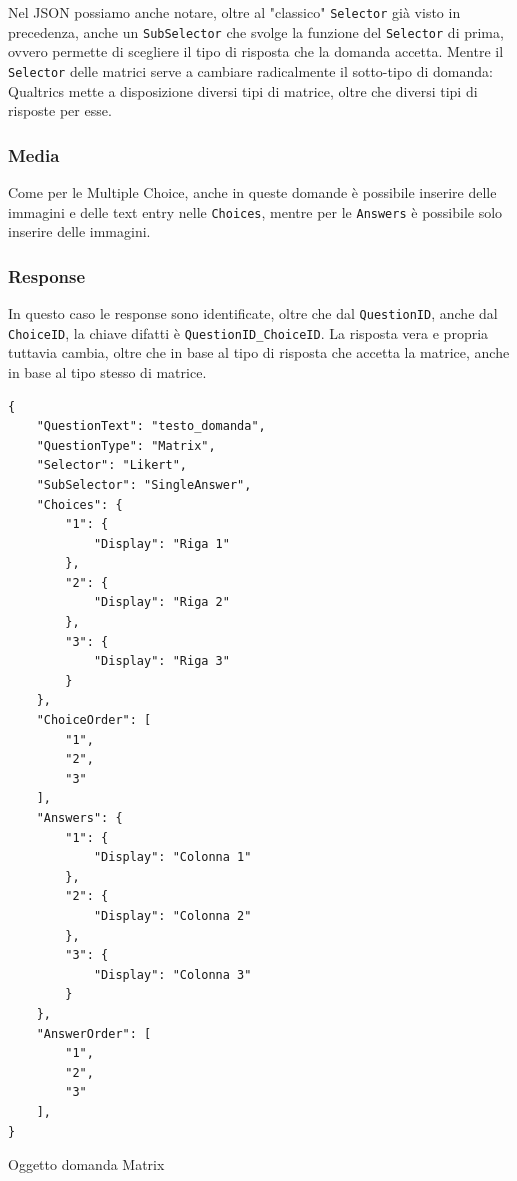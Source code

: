 Nel JSON possiamo anche notare, oltre al "classico" \texttt{Selector} già visto in precedenza, anche un \texttt{SubSelector} che svolge la funzione del \texttt{Selector} di prima, ovvero permette di scegliere il tipo di risposta che la domanda accetta. Mentre il \texttt{Selector} delle matrici serve a cambiare radicalmente il sotto-tipo di domanda: Qualtrics mette a disposizione diversi tipi di matrice, oltre che diversi tipi di risposte per esse.

\subsubsection{Media}
Come per le Multiple Choice, anche in queste domande è possibile inserire delle immagini e delle text entry nelle \texttt{Choices}, mentre per le \texttt{Answers} è possibile solo inserire delle immagini.

\subsubsection{Response}
In questo caso le response sono identificate, oltre che dal \texttt{QuestionID}, anche dal \texttt{ChoiceID}, la chiave difatti è \texttt{QuestionID\_ChoiceID}. La risposta vera e propria tuttavia cambia, oltre che in base al tipo di risposta che accetta la matrice, anche in base al tipo stesso di matrice.

\begin{json}
\begin{verbatim}
{
    "QuestionText": "testo_domanda",
    "QuestionType": "Matrix",
    "Selector": "Likert",
    "SubSelector": "SingleAnswer",
    "Choices": {
        "1": {
            "Display": "Riga 1"
        },
        "2": {
            "Display": "Riga 2"
        },
        "3": {
            "Display": "Riga 3"
        }
    },
    "ChoiceOrder": [
        "1",
        "2",
        "3"
    ],
    "Answers": {
        "1": {
            "Display": "Colonna 1"
        },
        "2": {
            "Display": "Colonna 2"
        },
        "3": {
            "Display": "Colonna 3"
        }
    },
    "AnswerOrder": [
        "1",
        "2",
        "3"
    ],
}
\end{verbatim}
\caption{Oggetto domanda Matrix}
\label{json:matrix}
\end{json}

